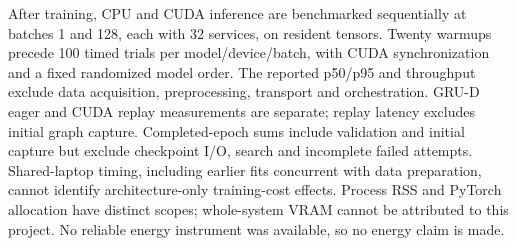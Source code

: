 After training, CPU and CUDA inference are benchmarked sequentially at batches 1 and 128, each with 32 services, on resident tensors. Twenty warmups precede 100 timed trials per model/device/batch, with CUDA synchronization and a fixed randomized model order. The reported p50/p95 and throughput exclude data acquisition, preprocessing, transport and orchestration. GRU-D eager and CUDA replay measurements are separate; replay latency excludes initial graph capture. Completed-epoch sums include validation and initial capture but exclude checkpoint I/O, search and incomplete failed attempts. Shared-laptop timing, including earlier fits concurrent with data preparation, cannot identify architecture-only training-cost effects. Process RSS and PyTorch allocation have distinct scopes; whole-system VRAM cannot be attributed to this project. No reliable energy instrument was available, so no energy claim is made.




